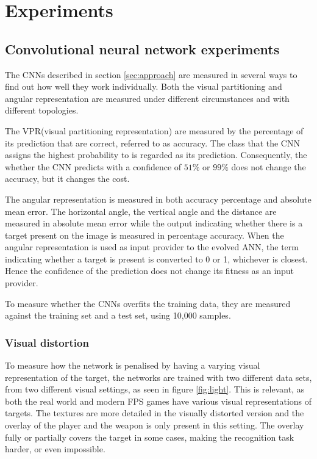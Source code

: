 \section{Experiments}
\label{sec:experiments}

\subsection{Convolutional neural network experiments}
The CNNs described in section \ref{sec:approach} are measured in several ways to find out how well they work individually. Both the visual partitioning and angular representation are measured under different circumstances and with different topologies.

The VPR(visual partitioning representation) are measured by the percentage of its prediction that are correct, referred to as accuracy. The class that the CNN assigns the highest probability to is regarded as its prediction. Consequently, the whether the CNN predicts with a confidence of $51\%$ or $99\%$ does not change the accuracy, but it changes the cost.

The angular representation is measured in both accuracy percentage and absolute mean error. The horizontal angle, the vertical angle and the distance are measured in absolute mean error while the output indicating whether there is a target present on the image is measured in percentage accuracy. When the angular representation is used as input provider to the evolved ANN, the term indicating whether a target is present is converted to 0 or 1, whichever is closest. Hence the confidence of the prediction does not change its fitness as an input provider. 

To measure whether the CNNs overfits the training data, they are measured against the training set and a test set, using 10,000 samples.

\subsubsection{Visual distortion}
To measure how the network is penalised by having a varying visual representation of the target, the networks are trained with two different data sets, from two different visual settings, as seen in figure \ref{fig:light}. This is relevant, as both the real world and modern FPS games have various visual representations of targets. The textures are more detailed in the visually distorted version and the overlay of the player and the weapon is only present in this setting. The overlay fully or partially covers the target in some cases, making the recognition task harder, or even impossible.


